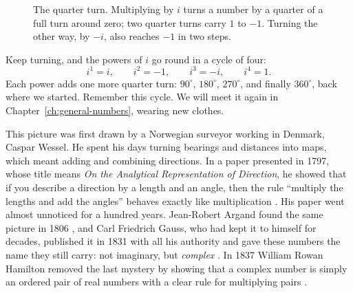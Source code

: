 \begin{figure}[tb]
\myfloatalign
{}
\caption[The quarter turn]{The quarter turn. Multiplying by $i$ turns a number by a quarter of a full turn around zero; two quarter turns carry $1$ to $-1$. Turning the other way, by $-i$, also reaches $-1$ in two steps.}
\label{fig:quarter-turn}
\end{figure}

Keep turning, and the powers of $i$ go round in a cycle of four:
\[
i^1 = i, \qquad i^2 = -1, \qquad i^3 = -i, \qquad i^4 = 1 .
\]
Each power adds one more quarter turn: $90^\circ$, $180^\circ$, $270^\circ$, and finally $360^\circ$, back where we started. Remember this cycle. We will meet it again in Chapter~\ref{ch:general-numbers}, wearing new clothes.


This picture was first drawn by a Norwegian surveyor working in Denmark, Caspar Wessel. He spent his days turning bearings and distances into maps, which meant adding and combining directions. In a paper presented in 1797, whose title means \emph{On the Analytical Representation of Direction}, he showed that if you describe a direction by a length and an angle, then the rule ``multiply the lengths and add the angles'' behaves exactly like multiplication \citep{Wessel1799}. His paper went almost unnoticed for a hundred years. Jean-Robert Argand found the same picture in 1806 \citep{Argand1806}, and Carl Friedrich Gauss, who had kept it to himself for decades, published it in 1831 with all his authority and gave these numbers the name they still carry: not imaginary, but \emph{complex} \citep{Gauss1831}. In 1837 William Rowan Hamilton removed the last mystery by showing that a complex number is simply an ordered pair of real numbers with a clear rule for multiplying pairs \citep{Hamilton1837}.

